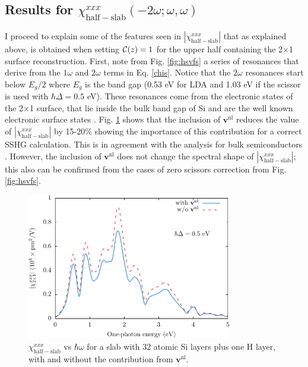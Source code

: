 \documentclass[11pt]{book}
\begin{document}
{%

\subsection{
\texorpdfstring{Results for $\chi^{xxx}_{\mathrm{half-slab}}
(-2\omega;\omega,\omega)$}
{Results for Xxxx(half-slab)(-2w;w,w)}}

I proceed to explain some of the features seen in
$|\chi^{xxx}_{\mathrm{half-slab}}|$ that as explained above, is obtained when
setting ${\mathbf{\cal C}}(z)=1$ for the upper half containing the 2$\times$1
surface reconstruction. First, note from Fig. \ref{fig:hsvfs} a series of
resonances that derive from the $1\omega$ and $2\omega$ terms in Eq.
\eqref{chis}. Notice that the $2\omega$ resonances start below $E_{g}/2$ where
$E_{g}$ is the band gap (0.53 eV for LDA and 1.03 eV if the scissor is used with
$\hbar\Delta=0.5$ eV). These resonances come from the electronic states of the
2$\times$1 surface, that lie inside the bulk band gap of Si and are the well
known electronic surface states \cite{rohlfingPRB95}. Fig. \ref{fig:vnl} shows
that the inclusion of $\mathbf{v}^\mathrm{nl}$ reduces the value of
$|\chi^{xxx}_{\mathrm{half-slab}}|$ by 15-20\% showing the importance of this
contribution for a correct SSHG calculation. This is in agreement with the
analysis for bulk semiconductors \cite{luppiPRB08}. However, the inclusion of
$\mathbf{v}^\mathrm{nl}$ does not change the spectral shape of
$|\chi^{xxx}_{\mathrm{half-slab}}|$; this also can be confirmed from the cases
of zero scissors correction from Fig. \ref{fig:hsvfs}.

\begin{figure}
\centering 
\includegraphics[width=0.8\textwidth]{../figures/04-results/fig-4_1_04}
\caption{$\chi^{xxx}_{\mathrm{half-slab}}$ vs $\hbar\omega$ for a slab with 32
atomic Si layers plus one H layer, with and without the contribution from
$\mathbf{v}^\mathrm{nl}$.
\label{fig:vnl}} 
\end{figure}

}
\end{document}
